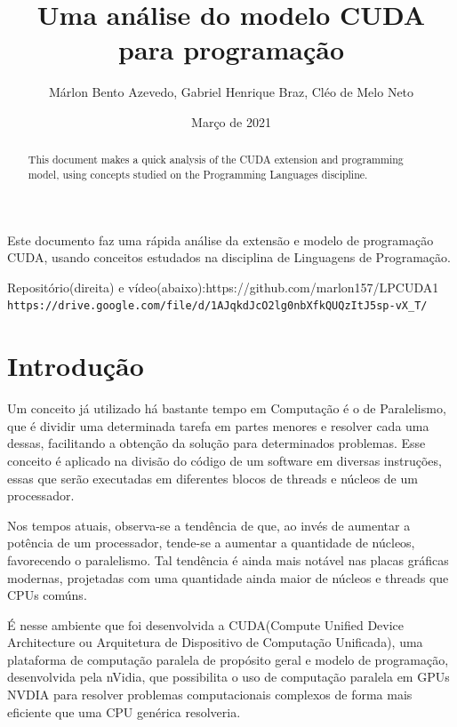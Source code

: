 \documentclass[12pt]{article}
\title{Uma análise do modelo CUDA para programação}
\author{Márlon Bento Azevedo, Gabriel Henrique Braz, Cléo de Melo Neto}
\date{Março de 2021}
\begin{document}
 

\maketitle

\begin{abstract}
  This document makes a quick analysis of the CUDA extension and programming model, using concepts studied on the Programming Languages discipline.
\end{abstract}
     
\begin{resumo} 
  Este documento faz uma rápida análise da extensão e modelo de programação CUDA, usando conceitos estudados na disciplina de Linguagens de Programação.
\end{resumo}

\begin{center}
    Repositório(direita) e vídeo(abaixo):https://github.com/marlon157/LPCUDA1
    \verb|https://drive.google.com/file/d/1AJqkdJcO2lg0nbXfkQUQzItJ5sp-vX_T/|
\end{center}


\section{Introdução}
\label{sec:intro}
Um conceito já utilizado há bastante tempo em Computação é o de Paralelismo, que é dividir uma determinada tarefa em partes menores e resolver cada uma dessas, facilitando a obtenção da solução para determinados problemas. Esse conceito é aplicado na divisão do código de um software em diversas instruções, essas que serão executadas em diferentes blocos de threads e núcleos de um processador.

Nos tempos atuais, observa-se a tendência de que, ao invés de aumentar a potência de um processador, tende-se a aumentar a quantidade de núcleos, favorecendo o paralelismo. Tal tendência é ainda mais notável nas placas gráficas modernas, projetadas com uma quantidade ainda maior de núcleos e threads que CPUs comúns.

É nesse ambiente que foi desenvolvida a CUDA(Compute Unified Device Architecture ou Arquitetura de Dispositivo de Computação Unificada), uma plataforma de computação paralela de propósito geral e modelo de programação, desenvolvida pela nVidia, que possibilita o uso de computação paralela em GPUs NVDIA para resolver problemas computacionais complexos de forma mais eficiente que uma CPU genérica resolveria.
\end{document}
